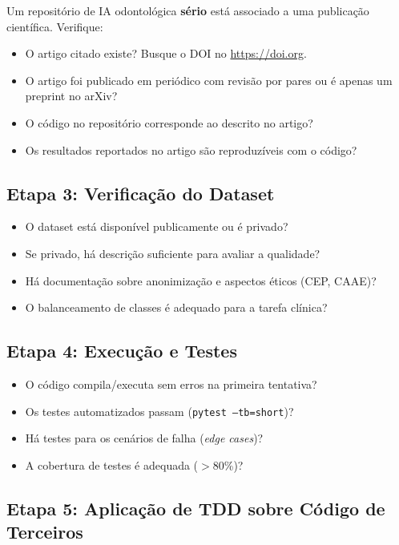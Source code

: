 Um repositório de IA odontológica \textbf{sério} está associado a uma
publicação científica. Verifique:

\begin{itemize}
  \item O artigo citado existe? Busque o DOI no \url{https://doi.org}.
  \item O artigo foi publicado em periódico com revisão por pares ou é
    apenas um preprint no arXiv?
  \item O código no repositório corresponde ao descrito no artigo?
  \item Os resultados reportados no artigo são reproduzíveis com o código?
\end{itemize}

\subsection{Etapa 3: Verificação do Dataset}

\begin{itemize}
  \item O dataset está disponível publicamente ou é privado?
  \item Se privado, há descrição suficiente para avaliar a qualidade?
  \item Há documentação sobre anonimização e aspectos éticos (CEP, CAAE)?
  \item O balanceamento de classes é adequado para a tarefa clínica?
\end{itemize}

\subsection{Etapa 4: Execução e Testes}

\begin{itemize}
  \item O código compila/executa sem erros na primeira tentativa?
  \item Os testes automatizados passam (\texttt{pytest --tb=short})?
  \item Há testes para os cenários de falha (\textit{edge cases})?
  \item A cobertura de testes é adequada ($>$80\%)?
\end{itemize}

\subsection{Etapa 5: Aplicação de TDD sobre Código de Terceiros}

